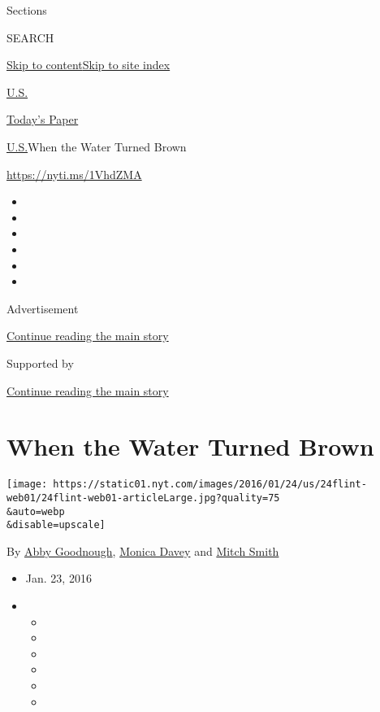 Sections

SEARCH

\protect\hyperlink{site-content}{Skip to
content}\protect\hyperlink{site-index}{Skip to site index}

\href{https://www.nytimes.com/section/us}{U.S.}

\href{https://myaccount.nytimes.com/auth/login?response_type=cookie\&client_id=vi}{}

\href{https://www.nytimes.com/section/todayspaper}{Today's Paper}

\href{/section/us}{U.S.}\textbar{}When the Water Turned Brown

\url{https://nyti.ms/1VhdZMA}

\begin{itemize}
\item
\item
\item
\item
\item
\item
\end{itemize}

Advertisement

\protect\hyperlink{after-top}{Continue reading the main story}

Supported by

\protect\hyperlink{after-sponsor}{Continue reading the main story}

\hypertarget{when-the-water-turned-brown}{%
\section{When the Water Turned
Brown}\label{when-the-water-turned-brown}}

\texttt{[image: https://static01.nyt.com/images/2016/01/24/us/24flint-web01/24flint-web01-articleLarge.jpg?quality=75\\\&auto=webp\\\&disable=upscale]}

By \href{http://www.nytimes.com/by/abby-goodnough}{Abby Goodnough},
\href{http://www.nytimes.com/by/monica-davey}{Monica Davey} and
\href{http://www.nytimes.com/by/mitch-smith}{Mitch Smith}

\begin{itemize}
\item
  Jan. 23, 2016
\item
  \begin{itemize}
  \item
  \item
  \item
  \item
  \item
  \item
  \end{itemize}
\end{itemize}

